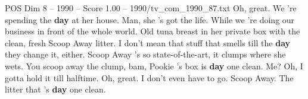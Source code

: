 \begin{textsample}{POS Dim 8 – 1990 – Score 1.00 – 1990/tv\_com\_1990\_87.txt}  \label{ex:f8_pos_075}
Oh, great.
We 're spending the \textbf{day} at her house.
Man, she 's got the life.
While we 're doing our business in front of the whole world.
Old tuna breast in her private box with the clean, fresh Scoop Away litter.
I don't mean that stuff that smells till the \textbf{day} they change it, either.
Scoop Away 's so state-of-the-art, it clumps where she wets.
You scoop away the clump, bam, Pookie 's box is \textbf{day} one clean.
Me?
Oh, I gotta hold it till halftime.
Oh, great.
I don't even have to go.
Scoop Away.
The litter that 's \textbf{day} one clean.

\end{textsample}
